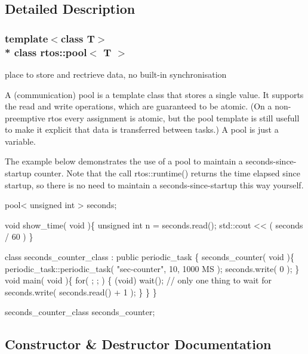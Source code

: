\subsection{Detailed Description}
\subsubsection*{template$<$class T$>$\\*
class rtos\+::pool$<$ T $>$}

place to store and rectrieve data, no built-\/in synchronisation 

A (communication) pool is a template class that stores a single value. It supports the read and write operations, which are guaranteed to be atomic. (On a non-\/preemptive rtos every assignment is atomic, but the pool template is still usefull to make it explicit that data is transferred between tasks.) A pool is just a variable.

The example below demonstrates the use of a pool to maintain a seconds-\/since-\/startup counter. Note that the call rtos\+::runtime() returns the time elapsed since startup, so there is no need to maintain a seconds-\/since-\/startup this way yourself.


\begin{DoxyCode}
pool< unsigned int > seconds;

\textcolor{keywordtype}{void} show\_time( \textcolor{keywordtype}{void} )\{
   \textcolor{keywordtype}{unsigned} \textcolor{keywordtype}{int} n = seconds.read();
   std::cout << ( seconds / 60 ) %
\}

\textcolor{keyword}{class }seconds\_counter\_class : \textcolor{keyword}{public} periodic\_task \{
   seconds\_counter( \textcolor{keywordtype}{void} )\{
      periodic\_task::periodic\_task( \textcolor{stringliteral}{"sec-counter"}, 10, 1000 MS );
      seconds.write( 0 );
   \}
   \textcolor{keywordtype}{void} main( \textcolor{keywordtype}{void} )\{
      \textcolor{keywordflow}{for}( ; ; ) \{
         (void) wait(); \textcolor{comment}{// only one thing to wait for}
         seconds.write( seconds.read() + 1 );
      \}
   \}
\}

seconds\_counter\_class seconds\_counter;
\end{DoxyCode}
 

\subsection{Constructor \& Destructor Documentation}
